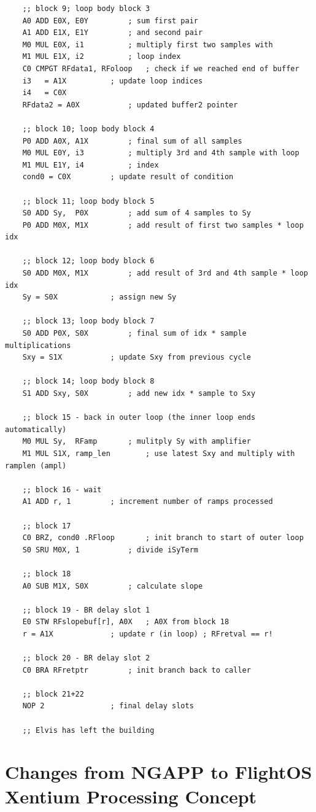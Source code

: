 \begin{lstlisting}
	;; block 9; loop body block 3
	A0 ADD E0X, E0Y			; sum first pair
	A1 ADD E1X, E1Y			; and second pair
	M0 MUL E0X, i1			; multiply first two samples with
	M1 MUL E1X, i2			; loop index
	C0 CMPGT RFdata1, RFoloop	; check if we reached end of buffer
	i3   = A1X			; update loop indices
	i4   = C0X
	RFdata2 = A0X			; updated buffer2 pointer

	;; block 10; loop body block 4
	P0 ADD A0X, A1X			; final sum of all samples
	M0 MUL E0Y, i3			; multiply 3rd and 4th sample with loop
	M1 MUL E1Y, i4			; index
	cond0 = C0X			; update result of condition
	
	;; block 11; loop body block 5
	S0 ADD Sy,  P0X			; add sum of 4 samples to Sy
	P0 ADD M0X, M1X			; add result of first two samples * loop idx

	;; block 12; loop body block 6
	S0 ADD M0X, M1X			; add result of 3rd and 4th sample * loop idx
	Sy = S0X			; assign new Sy
	
	;; block 13; loop body block 7
	S0 ADD P0X, S0X			; final sum of idx * sample multiplications	
	Sxy = S1X			; update Sxy from previous cycle

	;; block 14; loop body block 8
	S1 ADD Sxy, S0X	 		; add new idx * sample to Sxy
		
	;; block 15 - back in outer loop (the inner loop ends automatically)
	M0 MUL Sy,  RFamp		; mulitply Sy with amplifier
	M1 MUL S1X, ramp_len		; use latest Sxy and multiply with ramplen (ampl)

	;; block 16 - wait 
	A1 ADD r, 1			; increment number of ramps processed 

	;; block 17
	C0 BRZ, cond0 .RFloop		; init branch to start of outer loop
	S0 SRU M0X, 1			; divide iSyTerm

	;; block 18	
	A0 SUB M1X, S0X			; calculate slope

	;; block 19 - BR delay slot 1
	E0 STW RFslopebuf[r], A0X	; A0X from block 18
	r = A1X				; update r (in loop) ; RFretval == r!

	;; block 20 - BR delay slot 2
	C0 BRA RFretptr			; init branch back to caller

	;; block 21+22
	NOP 2				; final delay slots

	;; Elvis has left the building
\end{lstlisting}




\appendix
\chapter {Changes from NGAPP to FlightOS Xentium Processing Concept}

